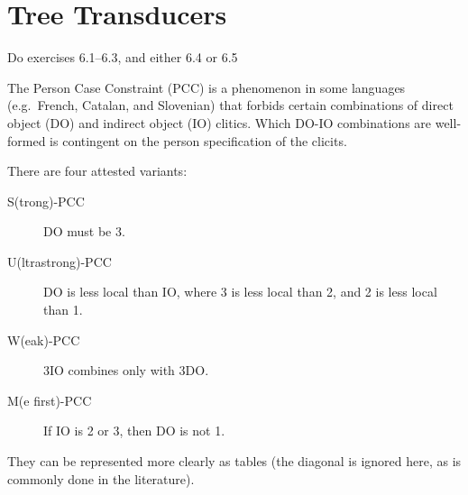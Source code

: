 \chapter{Tree Transducers}
\label{cha:transducers}

Do exercises 6.1--6.3, and either 6.4 or 6.5

\begin{exercise}
    The Person Case Constraint (PCC) is a phenomenon in some languages (e.g.\ French, Catalan, and Slovenian) that forbids certain combinations of direct object (DO) and indirect object (IO) clitics.
    Which DO-IO combinations are well-formed is contingent on the person specification of the clicits.

    \begin{exe}
    \end{exe}

    There are four attested variants:
    \begin{description}
        \item[S(trong)-PCC] DO must be 3. \cite{Bonet94}
        \item[U(ltrastrong)-PCC] DO is less local than IO, where 3 is less local than 2, and 2 is less local than 1. \cite{Nevins07}
        \item[W(eak)-PCC] 3IO combines only with 3DO. \cite{Bonet94}
        \item[M(e first)-PCC] If IO is 2 or 3, then DO is not 1. \cite{Nevins07}
    \end{description}
    They can be represented more clearly as tables (the diagonal is ignored here, as is commonly done in the literature).


\end{exercise}

